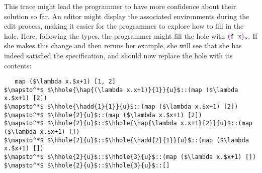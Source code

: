 This trace might lead the programmer to have more confidence about their
solution so far. An editor might display the associated environments during
the edit process, making it easier for the programmer to explore how to
fill in the hole. Here, following the types, the programmer might fill the
hole with $\textcolor{violet}{\llparenthesis}\texttt{f x}\textcolor{violet}{\rrparenthesis}_{u}$. If she makes this change and then
reruns her example, she will see that she has indeed satisfied the
specification, and should now replace the hole with its contents:
\begin{lstlisting}
   map ($\lambda x.$x+1) [1, 2]
$\mapsto^*$ $\hhole{\hap{(\lambda x.x+1)}{1}}{u}$::(map ($\lambda x.$x+1) [2])
$\mapsto^*$ $\hhole{\hadd{1}{1}}{u}$::(map ($\lambda x.$x+1) [2])
$\mapsto^*$ $\hhole{2}{u}$::(map ($\lambda x.$x+1) [2])
$\mapsto^*$ $\hhole{2}{u}$::$\hhole{\hap{\lambda x.x+1}{2}}{u}$::(map ($\lambda x.$x+1) [])
$\mapsto^*$ $\hhole{2}{u}$::$\hhole{\hadd{2}{1}}{u}$::(map ($\lambda x.$x+1) [])
$\mapsto^*$ $\hhole{2}{u}$::$\hhole{3}{u}$::(map ($\lambda x.$x+1) [])
$\mapsto^*$ $\hhole{2}{u}$::$\hhole{3}{u}$::[]
\end{lstlisting}
